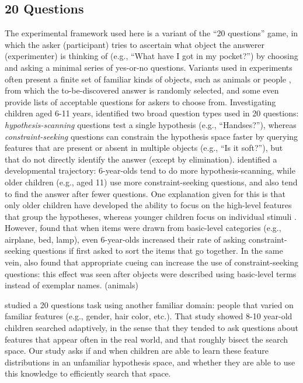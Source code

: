 \documentclass[10pt,letterpaper]{article}
\begin{document}
\subsection{20 Questions}

The experimental framework used here is a variant of the ``20 questions'' game, in which the asker (participant) tries to ascertain what object the answerer (experimenter) is thinking of (e.g., ``What have I got in my pocket?'') by choosing and asking a minimal series of yes-or-no questions. Variants used in experiments often present a finite set of familiar kinds of objects, such as animals \cite{Ruggeri:2015front} or people \cite{Nelson:2014}, from which the to-be-discovered answer is randomly selected, and some even provide lists of acceptable questions for askers to choose from. Investigating children aged 6-11 years,  identified two broad question types used in 20 questions: \emph{hypothesis-scanning} questions test a single hypothesis (e.g., ``Handses?''), whereas \emph{constraint-seeking} questions can constrain the hypothesis space faster by querying features that are present or absent in multiple objects (e.g., ``Is it soft?''), but that do not directly identify the answer (except by elimination).  identified a developmental trajectory: 6-year-olds tend to do more hypothesis-scanning, while older children (e.g., aged 11) use more constraint-seeking questions, and also tend to find the answer after fewer questions. One explanation given for this is that only older children have developed the ability to focus on the high-level features that group the hypotheses, whereas younger children focus on individual stimuli \cite{Mosher:1966,Ruggeri:2015front}. However,  found that when items were drawn from basic-level categories (e.g., airplane, bed, lamp), even 6-year-olds increased their rate of asking constraint-seeking questions if first asked to sort the items that go together. In the same vein,  also found that appropriate cueing can increase the use of constraint-seeking questions: this effect was seen after objects were described using basic-level terms instead of exemplar names. (animals)

 studied a 20 questions task using another familiar domain: people that varied on familiar features (e.g., gender, hair color, etc.). That study showed 8-10 year-old children searched adaptively, in the sense that they tended to ask questions about features that appear often in the real world, and that roughly bisect the search space. Our study asks if and when children are able to learn these feature distributions in an unfamiliar hypothesis space, and whether they are able to use this knowledge to efficiently search that space.
\end{document}

